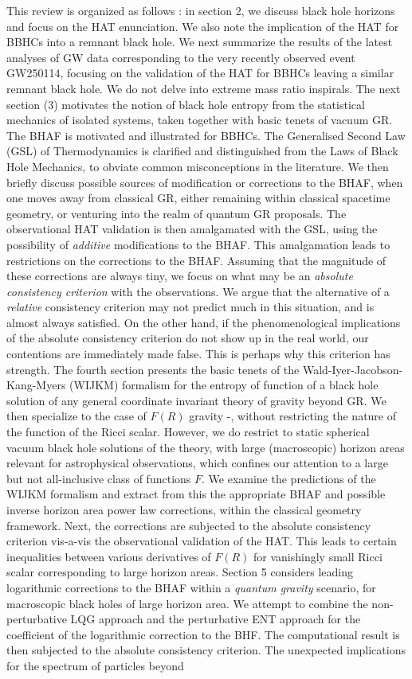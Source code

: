 \documentclass[11pt]{article}
\begin{document}
This review is organized as follows : in section 2, we discuss black hole horizons and focus on the HAT enunciation. We also note the implication of the HAT for BBHCs into a remnant black hole. We next 
summarize the results of the latest analyses of GW data corresponding to the very recently observed event GW250114, focusing on the validation of the HAT for BBHCs leaving a similar remnant black hole. We do not delve into extreme mass ratio inspirals. The next section (3) motivates the notion of black hole entropy from the statistical mechanics of isolated systems, taken together with basic tenets of vacuum GR. The BHAF is motivated and illustrated for BBHCs. The Generalised Second Law (GSL) of Thermodynamics is clarified and distinguished from the Laws of Black Hole Mechanics, to obviate common misconceptions in the literature. We then briefly discuss possible sources of modification or corrections to the BHAF, when one moves away from classical GR, either remaining within classical spacetime geometry, or venturing into the realm of quantum GR proposals. The observational HAT validation is then amalgamated with the GSL, using the possibility of {\it additive} modifications to the BHAF. This amalgamation leads to restrictions on the corrections to the BHAF. Assuming that the magnitude of these corrections are always tiny, we focus on what may be an {\it absolute consistency criterion} with the observations. We argue that the alternative of a {\it relative} consistency criterion may not predict much in this situation, and is almost always satisfied. On the other hand, if the phenomenological implications of the absolute consistency criterion do not show up in the real world, our contentions are immediately made false. This is perhaps why this criterion has strength. The fourth section presents the basic tenets of the Wald-Iyer-Jacobson-Kang-Myers (WIJKM) formalism for the entropy of function of a black hole solution of any general coordinate invariant theory of gravity beyond GR. We then specialize to the case of $F(R)$ gravity \cite{bre2004}-\cite{mod2011}, without restricting the nature of the function of the Ricci scalar. However, we do restrict to static spherical vacuum black hole solutions of the theory,  with large (macroscopic) horizon areas relevant for astrophysical observations, which confines our attention to a large but not all-inclusive class of functions $F$.  We examine the predictions of the WIJKM formalism and extract from this the appropriate BHAF and possible inverse horizon area power law corrections, within the classical geometry framework. Next, the corrections are subjected to the absolute consistency criterion vis-a-vis the observational validation of the HAT. This leads to certain inequalities between various derivatives of $F(R)$ for vanishingly small Ricci scalar corresponding to large horizon areas. Section 5 considers leading logarithmic corrections to the BHAF within a {\it quantum gravity} scenario, for macroscopic black holes of large horizon area. We attempt to combine the non-perturbative LQG approach and the perturbative ENT approach for the coefficient of the logarithmic correction to the BHF. The computational result is then subjected to the absolute consistency criterion. The unexpected implications for the spectrum of particles beyond 
\end{document}
